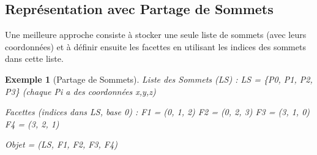 \documentclass{article}
\newtheorem{example}{Exemple}
\begin{document}
\subsection{Représentation avec Partage de Sommets}
Une meilleure approche consiste à stocker une seule liste de sommets (avec leurs coordonnées) et à définir ensuite les facettes en utilisant les indices des sommets dans cette liste.

\begin{example}[Partage de Sommets]
Liste des Sommets (LS) : LS = \{P0, P1, P2, P3\} (chaque Pi a des coordonnées x,y,z)

Facettes (indices dans LS, base 0) :
F1 = (0, 1, 2) %
F2 = (0, 2, 3) %
F3 = (3, 1, 0) %
F4 = (3, 2, 1) %

Objet = (LS, {F1, F2, F3, F4})
\end{example}
\end{document}
